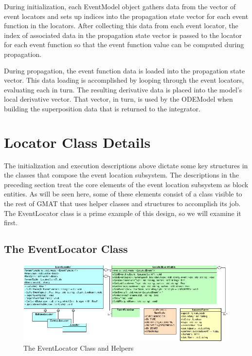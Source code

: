 \documentclass[letterpaper,10pt]{article}
\begin{document}
During initialization, each EventModel object gathers data from the vector of event locators and sets up indices into the propagation state vector for each event function in the locators.  After collecting this data from each event locator, the index of associated data in the propagation state vector is passed to the locator for each event function so that the event function value can be computed during propagation.

During propagation, the event function data is loaded into the propagation state vector.  This data loading is accomplished by looping through the event locators, evaluating each in turn.  The resulting derivative data is placed into the model's local derivative vector.  That vector, in turn, is used by the ODEModel when building the superposition data that is returned to the integrator.

\section{Locator Class Details}

The initialization and execution descriptions above dictate some key structures
in the classes that compose the event location subsystem.  The descriptions in
the preceding section treat the core elements of the event location subsystem
as block entities.  As will be seen here, some of these elements consist of a
class visible to the rest of GMAT that uses helper classes and structures to
accomplish its job. The EventLocator class is a prime example of this design,
so we will examine it first.

\subsection{The EventLocator Class}

\begin{figure}[ht]
\begin{center}
\includegraphics[scale=1.7]{./Images/EventLocator.eps}
\caption{\label{fig:EventLocator}The EventLocator Class and Helpers}
\end{center}
\end{figure} 
\end{document}
